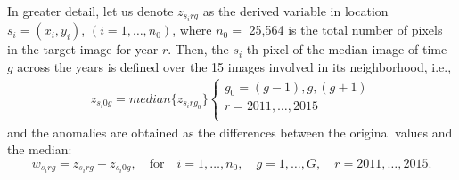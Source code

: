 In greater detail, let us denote $z_{s_irg}$ as the derived variable in location $s_i=(x_i,y_i)$, $(i=1,\ldots,n_0)$,
where $n_0=$ 25,564 is the total number of pixels in the target image for year $r$.
Then, the $s_i$-th pixel of the median image of time $g$ across the years is defined over the 15 images involved in its neighborhood, i.e.,
\begin{eqnarray}
\displaystyle z_{s_i0g}=median\{z_{s_irg_0}\} \left\{
\begin{array}{l}
 g_0=(g-1),g,(g+1)\\
 r=2011,\ldots, 2015\\
 \end{array}
    \right.
\end{eqnarray}
and the anomalies are obtained as the differences between the original values and the median:
\begin{equation}
w_{s_irg}=z_{s_irg}-z_{s_i0g}, \quad \mbox{for} \quad i=1,\ldots,n_0, \quad
 g=1,\ldots,G, \quad r=2011,\ldots, 2015.
 \end{equation}


